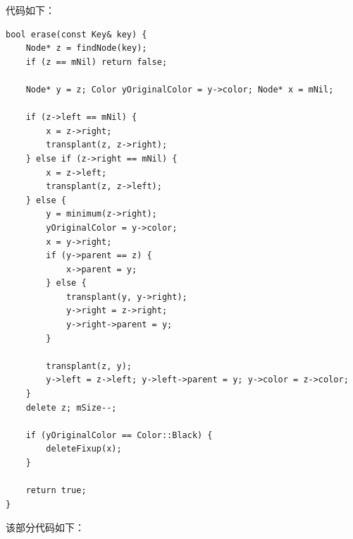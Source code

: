\documentclass[UTF8,12pt,a4paper]{ctexart}
\begin{document}
代码如下：

\begin{lstlisting}[caption={红黑树删除操作（erase）}]
bool erase(const Key& key) {
    Node* z = findNode(key);
    if (z == mNil) return false;

    Node* y = z; Color yOriginalColor = y->color; Node* x = mNil;

    if (z->left == mNil) {
        x = z->right;
        transplant(z, z->right);
    } else if (z->right == mNil) {
        x = z->left;
        transplant(z, z->left);
    } else {
        y = minimum(z->right);
        yOriginalColor = y->color;
        x = y->right;
        if (y->parent == z) {
            x->parent = y;
        } else {
            transplant(y, y->right);
            y->right = z->right;
            y->right->parent = y;
        }

        transplant(z, y);
        y->left = z->left; y->left->parent = y; y->color = z->color;
    }
    delete z; mSize--;
    
    if (yOriginalColor == Color::Black) {
        deleteFixup(x);
    }
    
    return true;
}
\end{lstlisting}


\vspace{1em}

该部分代码如下：
\end{document}
